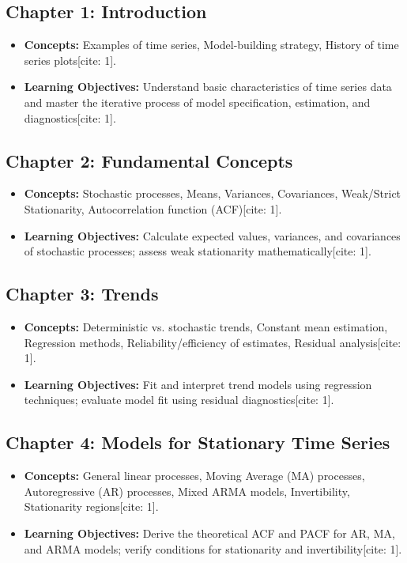 \documentclass{article}
\begin{document}
\subsection*{Chapter 1: Introduction}
\begin{itemize}
    \item \textbf{Concepts:} Examples of time series, Model-building strategy, History of time series plots[cite: 1].
    \item \textbf{Learning Objectives:} Understand basic characteristics of time series data and master the iterative process of model specification, estimation, and diagnostics[cite: 1].
\end{itemize}

\subsection*{Chapter 2: Fundamental Concepts}
\begin{itemize}
    \item \textbf{Concepts:} Stochastic processes, Means, Variances, Covariances, Weak/Strict Stationarity, Autocorrelation function (ACF)[cite: 1].
    \item \textbf{Learning Objectives:} Calculate expected values, variances, and covariances of stochastic processes; assess weak stationarity mathematically[cite: 1].
\end{itemize}

\subsection*{Chapter 3: Trends}
\begin{itemize}
    \item \textbf{Concepts:} Deterministic vs. stochastic trends, Constant mean estimation, Regression methods, Reliability/efficiency of estimates, Residual analysis[cite: 1].
    \item \textbf{ Learning Objectives:} Fit and interpret trend models using regression techniques; evaluate model fit using residual diagnostics[cite: 1].
\end{itemize}

\subsection*{Chapter 4: Models for Stationary Time Series}
\begin{itemize}
    \item \textbf{Concepts:} General linear processes, Moving Average (MA) processes, Autoregressive (AR) processes, Mixed ARMA models, Invertibility, Stationarity regions[cite: 1].
    \item \textbf{Learning Objectives:} Derive the theoretical ACF and PACF for AR, MA, and ARMA models; verify conditions for stationarity and invertibility[cite: 1].
\end{itemize}
\end{document}
